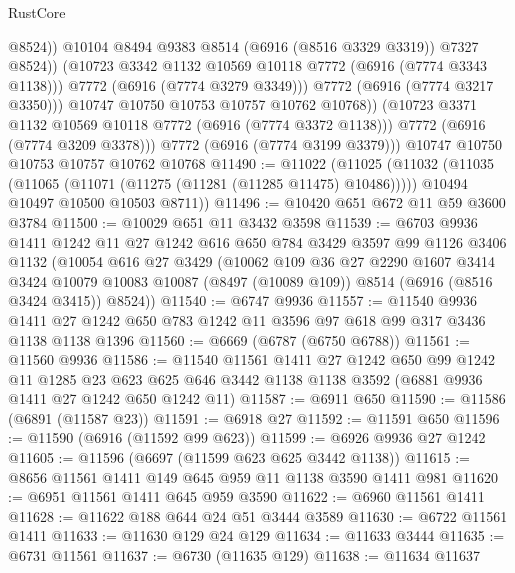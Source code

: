 \begin{lexlean}{RustCore}
\begin{coremodule}
                        @8524))
                    @10104
                    @8494
                    @9383
                    @8514
                    (@6916 (@8516 @3329 @3319))
                    @7327
                    @8524))
                (@10723 @3342 @1132 @10569 @10118 @7772 (@6916 (@7774 @3343 @1138)))
                @7772
                (@6916 (@7774 @3279 @3349)))
              @7772
              (@6916 (@7774 @3217 @3350)))
            @10747
            @10750
            @10753
            @10757
            @10762
            @10768))
        (@10723 @3371 @1132 @10569 @10118 @7772 (@6916 (@7774 @3372 @1138)))
        @7772
        (@6916 (@7774 @3209 @3378)))
      @7772
      (@6916 (@7774 @3199 @3379)))
    @10747
    @10750
    @10753
    @10757
    @10762
    @10768
@11490 := @11022
    (@11025
      (@11032
        (@11035 (@11065 (@11071 (@11275 (@11281 (@11285 @11475) @10486)))))
        @10494
        @10497
        @10500
        @10503
        @8711))
@11496 := @10420 @651 @672 @11 @59 @3600 @3784
@11500 := @10029 @651 @11 @3432 @3598
@11539 := @6703
    @9936
    @1411
    @1242
    @11
    @27
    @1242
    @616
    @650
    @784
    @3429
    @3597
    @99
    @1126
    @3406
    @1132
    (@10054
      @616
      @27
      @3429
      (@10062
        @109
        @36
        @27
        @2290
        @1607
        @3414
        @3424
        @10079
        @10083
        @10087
        (@8497 (@10089 @109))
        @8514
        (@6916 (@8516 @3424 @3415))
        @8524))
@11540 := @6747 @9936
@11557 := @11540
    @9936
    @1411
    @27
    @1242
    @650
    @783
    @1242
    @11
    @3596
    @97
    @618
    @99
    @317
    @3436
    @1138
    @1138
    @1396
@11560 := @6669 (@6787 (@6750 @6788))
@11561 := @11560 @9936
@11586 := @11540
    @11561
    @1411
    @27
    @1242
    @650
    @99
    @1242
    @11
    @1285
    @23
    @623
    @625
    @646
    @3442
    @1138
    @1138
    @3592
    (@6881 @9936 @1411 @27 @1242 @650 @1242 @11)
@11587 := @6911 @650
@11590 := @11586 (@6891 (@11587 @23))
@11591 := @6918 @27
@11592 := @11591 @650
@11596 := @11590 (@6916 (@11592 @99 @623))
@11599 := @6926 @9936 @27 @1242
@11605 := @11596 (@6697 (@11599 @623 @625 @3442 @1138))
@11615 := @8656 @11561 @1411 @149 @645 @959 @11 @1138 @3590 @1411 @981
@11620 := @6951 @11561 @1411 @645 @959 @3590
@11622 := @6960 @11561 @1411
@11628 := @11622 @188 @644 @24 @51 @3444 @3589
@11630 := @6722 @11561 @1411
@11633 := @11630 @129 @24 @129
@11634 := @11633 @3444
@11635 := @6731 @11561
@11637 := @6730 (@11635 @129)
@11638 := @11634 @11637

\end{coremodule}
\end{lexlean}
